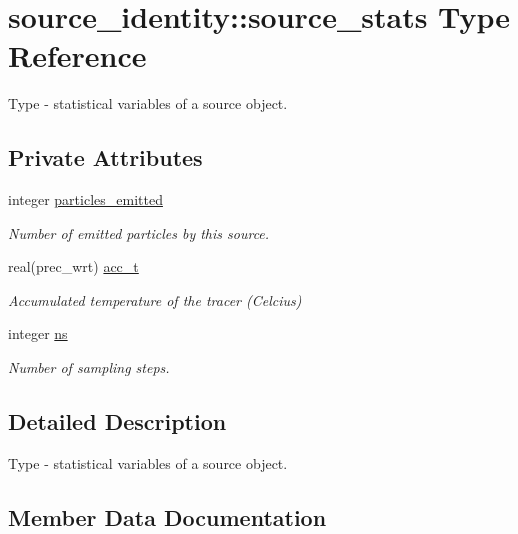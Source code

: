 \hypertarget{structsource__identity_1_1source__stats}{}\section{source\+\_\+identity\+:\+:source\+\_\+stats Type Reference}
\label{structsource__identity_1_1source__stats}


Type -\/ statistical variables of a source object.  


\subsection*{Private Attributes}
\begin{DoxyCompactItemize}
\item 
integer \hyperlink{structsource__identity_1_1source__stats_a1b11065093e55320520604392399d1c9}{particles\+\_\+emitted}
\begin{DoxyCompactList}\small\item\em Number of emitted particles by this source. \end{DoxyCompactList}\item 
real(prec\+\_\+wrt) \hyperlink{structsource__identity_1_1source__stats_a76eafb42aad8f5a2a859f12c0fd6f683}{acc\+\_\+t}
\begin{DoxyCompactList}\small\item\em Accumulated temperature of the tracer (Celcius) \end{DoxyCompactList}\item 
integer \hyperlink{structsource__identity_1_1source__stats_a0d1e978cf3224049d1c15b23b8d16fa7}{ns}
\begin{DoxyCompactList}\small\item\em Number of sampling steps. \end{DoxyCompactList}\end{DoxyCompactItemize}


\subsection{Detailed Description}
Type -\/ statistical variables of a source object. 

\subsection{Member Data Documentation}
\mbox{\label{structsource__identity_1_1source__stats_a76eafb42aad8f5a2a859f12c0fd6f683}} 

